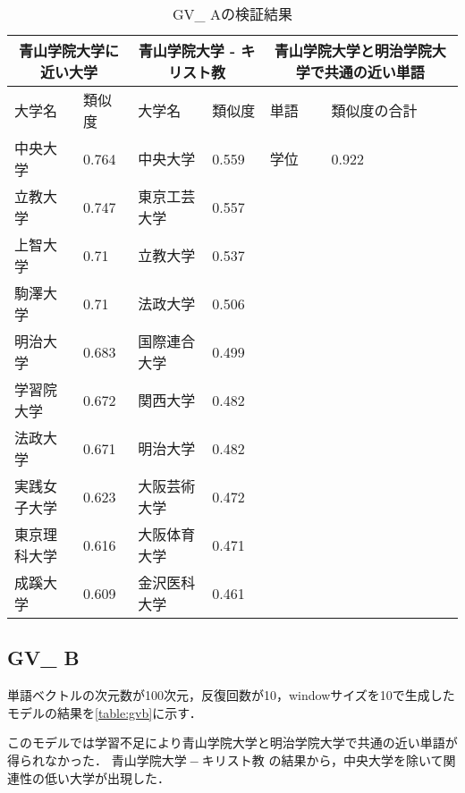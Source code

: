 \begin{table}[H]
\caption{GV\_ Aの検証結果}
\centering
\footnotesize
\begin{tabular}{ll|ll|ll}
\hline
\multicolumn{2}{c}{青山学院大学に近い大学} & \multicolumn{2}{c}{青山学院大学 - キリスト教} & \multicolumn{2}{c}{青山学院大学と明治学院大学で共通の近い単語}
\\ \hline
大学名 & 類似度 & 大学名 & 類似度 & 単語 & 類似度の合計
\\ \hline \hline
中央大学 & 0.764 & 中央大学 & 0.559 & 学位 & 0.922\\
立教大学 & 0.747 & 東京工芸大学 & 0.557 & & \\
上智大学 & 0.71 & 立教大学 & 0.537 & & \\
駒澤大学 & 0.71 & 法政大学 & 0.506 & & \\
明治大学 & 0.683 & 国際連合大学 & 0.499 & & \\
学習院大学 & 0.672 & 関西大学 & 0.482 & & \\
法政大学 & 0.671 & 明治大学 & 0.482 & & \\
実践女子大学 & 0.623 & 大阪芸術大学 & 0.472 & & \\
東京理科大学 & 0.616 & 大阪体育大学 & 0.471 & & \\
成蹊大学 & 0.609 & 金沢医科大学 & 0.461 & & \\ \hline
\end{tabular}
\label{table:gva}
\end{table}


\subsection{GV\_ B}
単語ベクトルの次元数が100次元，反復回数が10，windowサイズを10で生成したモデルの結果を\ref{table:gvb}に示す．

このモデルでは学習不足により青山学院大学と明治学院大学で共通の近い単語が得られなかった．
$ 青山学院大学 - キリスト教 $ の結果から，中央大学を除いて関連性の低い大学が出現した．


